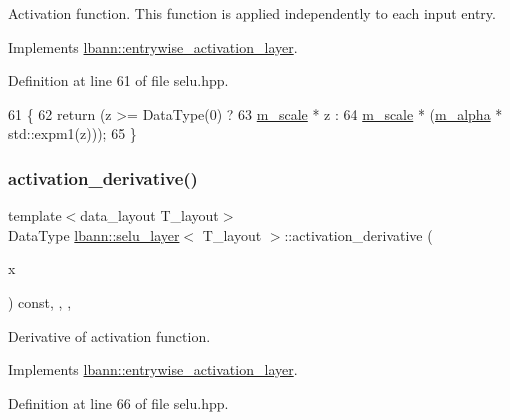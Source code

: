 Activation function. This function is applied independently to each input entry. 

Implements \hyperlink{classlbann_1_1entrywise__activation__layer_a69269401530a2112b66660383464bab9}{lbann\+::entrywise\+\_\+activation\+\_\+layer}.



Definition at line 61 of file selu.\+hpp.


\begin{DoxyCode}
61                                                  \{
62     \textcolor{keywordflow}{return} (z >= DataType(0) ?
63             \hyperlink{classlbann_1_1selu__layer_a9575be8104b1b24232a2d167405e693a}{m\_scale} * z :
64             \hyperlink{classlbann_1_1selu__layer_a9575be8104b1b24232a2d167405e693a}{m\_scale} * (\hyperlink{classlbann_1_1selu__layer_a72b22e92f3e70f6b996329e5b170554e}{m\_alpha} * std::expm1(z)));
65   \}
\end{DoxyCode}
\mbox{\label{classlbann_1_1selu__layer_ac5500795e66343c0c8968c24683b79f0}} 
\subsubsection{\texorpdfstring{activation\+\_\+derivative()}{activation\_derivative()}}
{\footnotesize\ttfamily template$<$data\+\_\+layout T\+\_\+layout$>$ \\
Data\+Type \hyperlink{classlbann_1_1selu__layer}{lbann\+::selu\+\_\+layer}$<$ T\+\_\+layout $>$\+::activation\+\_\+derivative (\begin{DoxyParamCaption}\item[{Data\+Type}]{x }\end{DoxyParamCaption}) const\hspace{0.3cm}{\ttfamily [inline]}, {\ttfamily [override]}, {\ttfamily [protected]}, {\ttfamily [virtual]}}

Derivative of activation function. 

Implements \hyperlink{classlbann_1_1entrywise__activation__layer_a7676a4c5060452a38264993554e79f8e}{lbann\+::entrywise\+\_\+activation\+\_\+layer}.



Definition at line 66 of file selu.\+hpp.


